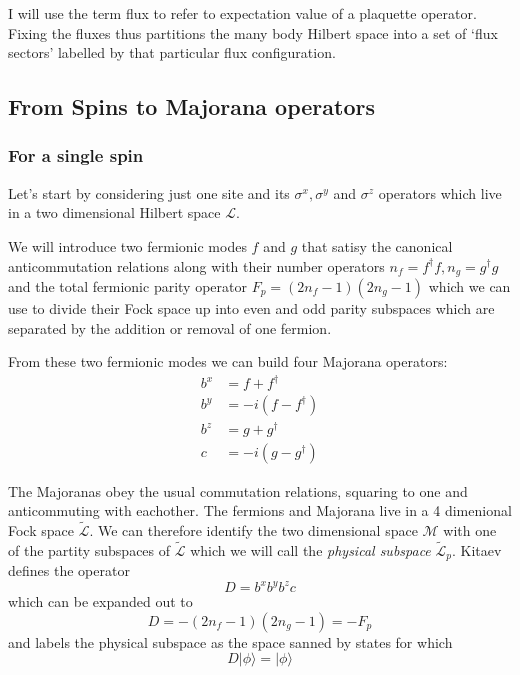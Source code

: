 I will use the term flux to refer to expectation value of a plaquette
operator. Fixing the fluxes thus partitions the many body Hilbert space
into a set of `flux sectors' labelled by that particular flux
configuration.

\hypertarget{from-spins-to-majorana-operators}{%
\subsection{From Spins to Majorana
operators}\label{from-spins-to-majorana-operators}}

\hypertarget{for-a-single-spin}{%
\subsubsection{For a single spin}\label{for-a-single-spin}}

Let's start by considering just one site and its \(\sigma^x, \sigma^y\)
and \(\sigma^z\) operators which live in a two dimensional Hilbert space
\(\mathcal{L}\).

We will introduce two fermionic modes \(f\) and \(g\) that satisy the
canonical anticommutation relations along with their number operators
\(n_f = f^\dagger f, n_g = g^\dagger g\) and the total fermionic parity
operator \(F_p = (2n_f - 1)(2n_g - 1)\) which we can use to divide their
Fock space up into even and odd parity subspaces which are separated by
the addition or removal of one fermion.

From these two fermionic modes we can build four Majorana operators:
\[\begin{aligned}
b^x &= f + f^\dagger\\
b^y &= -i(f - f^\dagger)\\
b^z &= g + g^\dagger\\
c   &= -i(g - g^\dagger)
\end{aligned}\]

The Majoranas obey the usual commutation relations, squaring to one and
anticommuting with eachother. The fermions and Majorana live in a 4
dimenional Fock space \(\mathcal{\tilde{L}}\). We can therefore identify
the two dimensional space \(\mathcal{M}\) with one of the partity
subspaces of \(\mathcal{\tilde{L}}\) which we will call the
\emph{physical subspace} \(\mathcal{\tilde{L}}_p\). Kitaev defines the
operator \[D = b^xb^yb^zc\] which can be expanded out to
\[D = -(2n_f - 1)(2n_g - 1) = -F_p\] and labels the physical subspace as
the space sanned by states for which \[ D|\phi\rangle = |\phi\rangle\]


